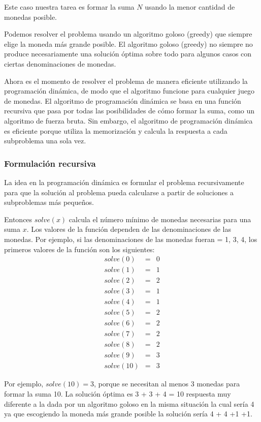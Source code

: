Este caso nuestra tarea es formar la suma $N$ usando la menor cantidad de monedas posible. 

Podemos resolver el problema usando un algoritmo goloso (greedy) que siempre elige la moneda más grande posible. El algoritmo goloso (greedy) no siempre no produce necesariamente una solución óptima sobre todo para algunos casos con ciertas denominaciones de monedas.

Ahora es el momento de resolver el problema de manera eficiente utilizando la programación dinámica, de modo que el algoritmo funcione para cualquier juego de monedas. El algoritmo de programación dinámica se basa en una función recursiva que pasa por todas las posibilidades de cómo formar la suma, como un algoritmo de fuerza bruta. Sin embargo, el algoritmo de programación dinámica es eficiente porque utiliza la memorización y calcula la respuesta a cada subproblema una sola vez.

\subsubsection{Formulación recursiva}

La idea en la programación dinámica es formular el problema recursivamente para que la solución al problema pueda calcularse a partir de soluciones a subproblemas más pequeños. 

Entonces $solve(x)$ calcula el número mínimo de monedas necesarias para una suma $x$. Los valores de la función dependen de las denominaciones de las monedas. Por ejemplo, si las denominaciones de las monedas fueran = {1, 3, 4}, los primeros valores de la función son los siguientes:\\


$$\begin{matrix}
    solve (0) & = & 0  \\
	solve (1) & = & 1\\
	solve (2) & = & 2\\
	solve (3) & = & 1\\
	solve (4) & = & 1\\
	solve (5) & = & 2\\
	solve (6) & = & 2\\
	solve (7) & = & 2\\
	solve (8) & = & 2\\
	solve (9) & = & 3\\
	solve (10) & = & 3
\end{matrix}$$
   
   
Por ejemplo, $solve(10) = 3$, porque se necesitan al menos 3 monedas para formar la suma 10. La solución óptima es 3 + 3 + 4 = 10 respuesta muy diferente a la dada por un algoritmo goloso en la misma situación la cual sería 4 ya que escogiendo la moneda más grande posible la solución sería 4 + 4 +1 +1.

